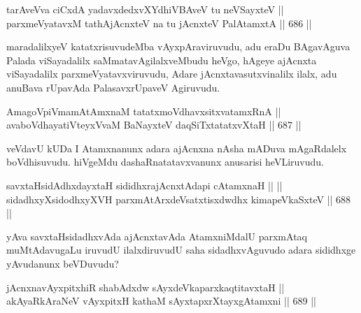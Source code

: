 \begin{shl}
tarAveVva ciCxdA yadavxdedxvXYdhiVBAveV tu neVSayxteV || \\
parxmeVyatavxM tathA\s jAcnxteV na tu jAcnxteV PalAtamxtA \hfill || 686 ||  
\end{shl}

\begin{artha} 
maradalilxyeV katatxrisuvudeMba vAyxpAraviruvudu, adu eraDu BAgavAguva Palada viSayadalilx saMmatavAgilalxveMbudu heVgo, hAgeye ajAcnxta viSayadalilx parxmeVyatavxviruvudu, Adare jAcnxtavasutxvinalilx ilalx, adu anuBava rUpavAda PalasavxrUpaveV Agiruvudu.
\end{artha}

\begin{shl}
AmagoV\s piVmamAtAmxnaM tatatxmoVdhavxsitxvatamxRnA || \\
avaboVdhayatiVteyxVvaM BaNayxteV daqSiTxtatatxvXtaH \hfill || 687 ||  
\end{shl}

\begin{artha} 
veVdavU kUDa I Atamxnanunx adara ajAcnxna nAsha mADuva mAgaRdalelx boVdhisuvudu. hiVgeMdu dashaRnatatavxvanunx anusarisi heVLiruvudu.
\end{artha}

\begin{shl}
savxtaHsidAdhxdayxtaH sididhxrajAcnxtAdapi cA\s \s tamxnaH ||  || \\
sidadhxyXsidodhxyXVH parxmAtArxdeVsatxtisxdwdhx kimapeVkaSxteV \hfill || 688 ||  
\end{shl}

\begin{artha} 
yAva savxtaHsidadhxvAda ajAcnxtavAda AtamxniMdalU parxmAtaq muMtAdavugaLu iruvudU ilalxdiruvudU saha sidadhxvAguvudo adara sididhxge yAvudanunx beVDuvudu?
\end{artha}


\begin{shl}
jAcnxnavAyxpitxhiR shabAdxdw sAyx\footnotemark[1]deVkaparxkaqtitavxtaH || \\
akAyaRkAraNeV vAyxpitxH kathaM sAyxtapxrXtayxgAtamxni \hfill || 689 ||  
\end{shl}

